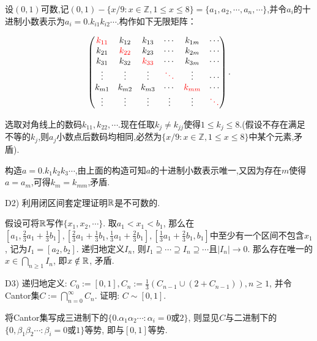 \begin{solution}
	设$(0,1)$可数,记$(0,1)-\{ x/9:x \in \mathbb{Z}, 1 \leq x \leq 8 \}=\{ a_1, a_2, \cdots ,a_n ,\cdots \}$,并令$a_i$的十进制小数表示为$a_i=0.k_{i1}k_{i2}\cdots$.构作如下无限矩阵：
	
	$$\begin{pmatrix}
 \color{red} k_{11} & k_{12} & k_{13} & \cdots & k_{1m} & \cdots \\
 k_{21} & \color{red} k_{22} & k_{23} & \cdots & k_{2m} & \cdots \\
 k_{31} & k_{32} & \color{red} k_{33} & \cdots & k_{3m} & \cdots \\
 \vdots & \vdots & \vdots & \color{red} \ddots & \vdots & \cdots \\
 k_{m1} & k_{m2} & k_{m3} & \cdots & \color{red} k_{mm} & \cdots \\
 \vdots & \vdots & \vdots & \vdots & \vdots & \color{red} \ddots
\end{pmatrix}.$$

	选取对角线上的数码$k_{11},k_{22},\cdots $.现在任取$k_j \neq k_{jj}$使得$1 \leq k_j \leq 8$.(假设不存在满足不等的$k_j$,则$a_j$小数点后数码均相同,必然为$\{ x/9:x \in \mathbb{Z}, 1 \leq x \leq 8 \}$中某个元素,矛盾).
	
	构造$a=0.k_1k_2k_3\cdots$,由上面的构造可知$a$的十进制小数表示唯一,又因为存在$m$使得$a=a_m$,可得$k_m=k_{mm}$,矛盾.
\end{solution}

D2) 利用闭区间套定理证明$\mathbb{R}$是不可数的. 

\begin{solution}
	假设可将$\mathbb{R}$写作$\{ x_1,x_2,\cdots \}$. 取$a_1<x_1<b_1$, 那么在$[a_1, \frac{2}{3}a_1+\frac{1}{3}b_1], [\frac{2}{3}a_1+\frac{1}{3}b_1, \frac{1}{3}a_1+\frac{2}{3}b_1], [\frac{1}{3}a_1+\frac{2}{3}b_1 , b_1]$中至少有一个区间不包含$x_1$, 记为$I_1=[a_2,b_2]$. 递归地定义$I_n$, 则$I_1 \supseteq \cdots \supseteq I_n \supseteq \cdots$且$|I_n| \to 0$. 那么存在唯一的$x \in \bigcap_{n \geq 1}I_n$, 即$x \notin \mathbb{R}$, 矛盾. 
\end{solution}

D3) 递归地定义: $C_0 := [0,1], C_n := \frac{1}{3} (C_{n-1} \cup (2+C_{n-1})) , n\geq 1$, 并令Cantor集$C := \bigcap_{n=0}^{\infty} C_n$. 证明: $C \sim [0,1]$. 

\begin{solution}
	将Cantor集写成三进制下的$\{ 0.\alpha _1 \alpha _2 \cdots : \alpha _i = 0 \text{或} 2\}$, 则显见$C$与二进制下的$\{ 0,\beta _1 \beta _2 \cdots : \beta _i= 0 \text{或} 1 \}$等势, 即与$[0,1]$等势. 
\end{solution}

